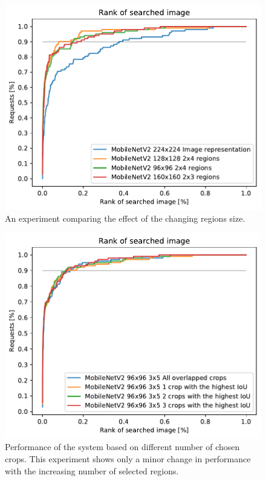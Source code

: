 \begin{figure}
\centering
\includegraphics[width=0.8\linewidth]{graphs/901175c0015f71987720d10953133afa566d88a09a6d7182a074859ff4e8409e.pdf}
\caption{An experiment comparing the effect of the changing regions size.}
\label{fig:different_region_size}
\end{figure}

\begin{figure}
\centering
\includegraphics[width=0.8\linewidth]{graphs/5c4a781f8e6f3eac93db2083bde3963c06582a92a8141411bf29e41251a98e75.pdf}
\caption{Performance of the system based on different number of chosen crops. This experiment shows only a minor change in performance with the increasing number of selected regions.}
\label{fig:crop_limitation}
\end{figure}


